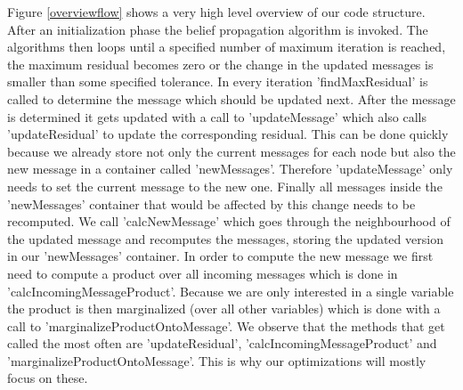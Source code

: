 Figure \ref{overviewflow} shows a very high level overview of our code structure. After an initialization phase the belief propagation algorithm is invoked. The algorithms then loops until a specified number of maximum iteration is reached, the maximum residual becomes zero or the change in the updated messages is smaller than some specified tolerance. In every iteration 'findMaxResidual' is called to determine the message which should be updated next. After the message is determined it gets updated with a call to 'updateMessage' which also calls 'updateResidual' to update the corresponding residual. This can be done quickly because we already store not only the current messages for each node but also the new message in a container called 'newMessages'. Therefore 'updateMessage' only needs to set the current message to the new one. Finally all messages inside the 'newMessages' container that would be affected by this change needs to be recomputed. We call 'calcNewMessage' which goes through the neighbourhood of the updated message and recomputes the messages, storing the updated version in our 'newMessages' container. In order to compute the new message we first need to compute a product over all incoming messages which is done in 'calcIncomingMessageProduct'. Because we are only interested in a single variable the product is then marginalized (over all other variables) which is done with a call to 'marginalizeProductOntoMessage'. We observe that the methods that get called the most often are 'updateResidual', 'calcIncomingMessageProduct' and 'marginalizeProductOntoMessage'. This is why our optimizations will mostly focus on these.

